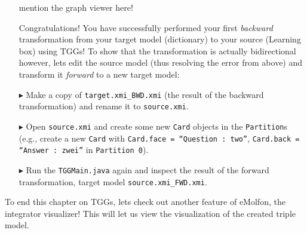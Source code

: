 \begin{itemize}
mention the graph viewer here!

\vspace{0.5cm}

Congratulations! You have successfully performed your first \emph{backward} transformation from your target model (dictionary) to your source (Learning box)
using TGGs! To show that the transformation is actually bidirectional however, lets edit the source model (thus resolving the error from above) and transform it
\emph{forward} to a new target model:


\item[$\blacktriangleright$] Make a copy of \texttt{target.xmi\_BWD.xmi} (the result of the backward transformation)
and rename it to \texttt{source.xmi}.
  
\item[$\blacktriangleright$] Open \texttt{source.xmi} and create some new \texttt{Card} objects in the \texttt{Partition}s (e.g., create a new \texttt{Card}
with \texttt{Card.face = ``Question : two''}, \texttt{Card.back = ``Answer : zwei''} in \texttt{Partition 0}).

\item[$\blacktriangleright$] Run the \texttt{TGGMain.java} again and inspect the result of the forward transformation, target model
\texttt{source.xmi\_FWD.xmi}.

\end{itemize}


To end this chapter on TGGs, lets check out another feature of eMolfon, the integrator visualizer! This will let us view the visualization of the created
triple model.

\newpage

